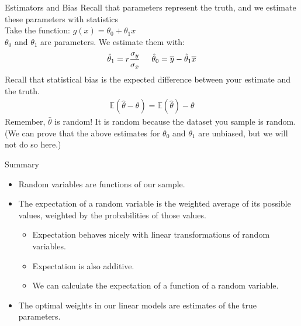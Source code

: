 \documentclass[aspectratio=169]{../latex_main/tntbeamer}  %
\begin{document}
	
	\begin{frame}[c]{Estimators and Bias}
	    Recall that parameters represent the truth, and we estimate these parameters with statistics\\
	    Take the function: $g(x) = \theta_0 + \theta_1x$\\
	   $\theta_0$ and $\theta_1$ are parameters. We estimate them with:
	    \begin{align*}
	       \hat{\theta}_1 = r\frac{\sigma_y}{\sigma_x}\hspace{5mm} \hat{\theta}_0 = \overline{y} - \hat{\theta}_1\overline{x}
	    \end{align*}
	    Recall that statistical bias is the expected difference between your estimate and the truth.
        \begin{align*}
            \mathbb{E}(\hat{\theta} - \theta) = \mathbb{E}(\hat{\theta}) - \theta
        \end{align*}
        Remember, $\hat{\theta}$	is random! It is random because the dataset you sample is random.\\
        (We can prove that the above estimates for $\theta_0$ and $\theta_1$ are unbiased, but we will not do so here.)

	\end{frame}
	
	
	\begin{frame}[c]{Summary}
	   \begin{itemize}
	       \item Random variables are functions of our sample.
	       \item The expectation of a random variable is the weighted average of its possible values, weighted by the probabilities of those values.
	       \begin{itemize}
	           \item Expectation behaves nicely with linear transformations of random variables.
	           \item Expectation is also additive.
	           \item We can calculate the expectation of a function of a random variable.
	       \end{itemize}
	       \item The optimal weights in our linear models are estimates of the true parameters.
	   \end{itemize}
	\end{frame}
	
\end{document}
